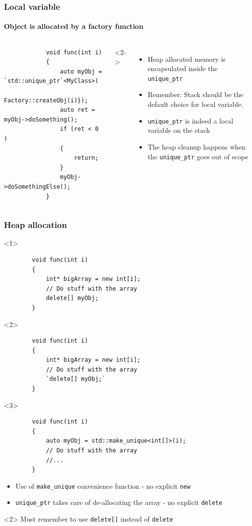 \documentclass{beamer}
\begin{document}
\begin{frame}[fragile,t]
\frametitle{Local variable}
\framesubtitle{Object is allocated by a factory function}
	\begin{columns}[t]
		\begin{lstlisting}
			void func(int i)
			{
				auto myObj = `std::unique_ptr`<MyClass>(
					Factory::createObj(i)});
				auto ret = myObj->doSomething();
				if (ret < 0 )
				{
					return;
				}
				myObj->doSomethingElse();
			}
		\end{lstlisting}
	<2->
		\begin{itemize}
			\item<2-> Heap allocated memory is encapsulated inside the \texttt{unique\_ptr}
			\item<3-> Remember: Stack should be the default choice for local variable.
			\item<4-> \texttt{unique\_ptr} is indeed a local variable on the stack
			\item<5-> The heap cleanup happens when the \texttt{unique\_ptr} goes out of scope
		\end{itemize}
	\end{columns}
\end{frame}

\begin{frame}[fragile,t]
\frametitle{Heap allocation}
	\begin{onlyenv}
	\begin{lstlisting}
		void func(int i)
		{
			int* bigArray = new int[i];
			// Do stuff with the array
			delete[] myObj;
		}
	\end{lstlisting}
	\end{onlyenv}
	
    \begin{onlyenv}<2>
	\begin{lstlisting}
		void func(int i)
		{
			int* bigArray = new int[i];
			// Do stuff with the array
			`delete[] myObj;`
		}
	\end{lstlisting}
	\end{onlyenv}

    \begin{onlyenv}<3>
	\begin{lstlisting}
		void func(int i)
		{
			auto myObj = std::make_unique<int[]>(i);
			// Do stuff with the array
			//...
		}
	\end{lstlisting}

	\begin{itemize}
		\item Use of \texttt{make\_unique} convenience function - no explicit \texttt{new}
		\item \texttt{unique\_ptr} takes care of de-allocating the array - no explicit \texttt{delete}
	\end{itemize}	
	\end{onlyenv}

	\begin{block}{}<2>
		Must remember to use \texttt{delete[]} instead of \texttt{delete}
	\end{block}
	
\end{frame}
\end{document}
